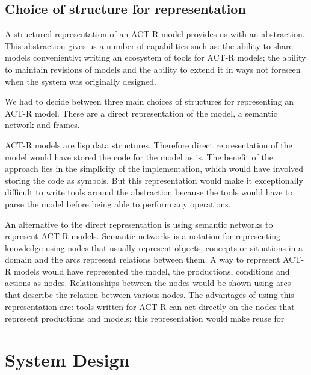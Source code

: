 \subsection{Choice of structure for representation}
A structured representation of an ACT-R model provides us with an
abstraction. This abstraction gives us a number of capabilities such
as: the ability to share models conveniently; writing an ecosystem of
tools for ACT-R models; the ability to maintain revisions of
models and the ability to extend it in ways not foreseen when the
system was originally designed.

We had to decide between three main choices of structures for
representing an ACT-R model. These are a direct representation of the
model, a semantic network and frames. 

ACT-R models are lisp data structures. Therefore direct representation
of the model would have stored the code for the model as is. The
benefit of the approach lies in the simplicity of the implementation,
which would have involved storing the code as symbols. But this
representation would make it exceptionally difficult to write tools
around the abstraction because the tools would have to parse the model
before being able to perform any operations.

An alternative to the direct representation is using semantic networks
to represent ACT-R models. Semantic networks is a notation for
representing knowledge using nodes that usually represent objects,
concepts or situations in a domain and the arcs represent relations
between them\cite{Sowa87, Barr81}. A way to represent ACT-R models
would have represented the model, the productions, conditions and
actions as nodes. Relationships between the nodes would be shown using
arcs that describe the relation between various nodes. The advantages
of using this representation are: tools written for ACT-R can act
directly on the nodes that represent productions and models; this
representation would make reuse for 




\section{System Design}

